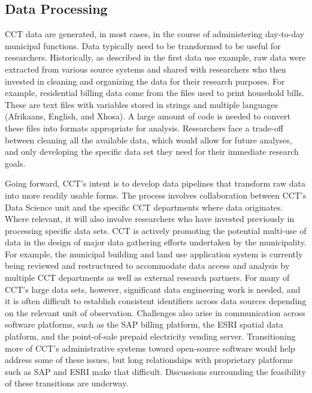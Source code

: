 \documentclass[
]{book}
\begin{document}
\hypertarget{data-processing}{%
\subsection{Data Processing}\label{data-processing}}

CCT data are generated, in most cases, in the course of administering day-to-day municipal functions. Data typically need to be transformed to be useful for researchers. Historically, as described in the first data use example, raw data were extracted from various source systems and shared with researchers who then invested in cleaning and organizing the data for their research purposes. For example, residential billing data come from the files used to print household bills. These are text files with variables stored in strings and multiple languages (Afrikaans, English, and Xhosa). A large amount of code is needed to convert these files into formats appropriate for analysis. Researchers face a trade-off between cleaning all the available data, which would allow for future analyses, and only developing the specific data set they need for their immediate research goals.

Going forward, CCT's intent is to develop data pipelines that transform raw data into more readily usable forms. The process involves collaboration between CCT's Data Science unit and the specific CCT departments where data originates. Where relevant, it will also involve researchers who have invested previously in processing specific data sets. CCT is actively promoting the potential multi-use of data in the design of major data gathering efforts undertaken by the municipality. For example, the municipal building and land use application system is currently being reviewed and restructured to accommodate data access and analysis by multiple CCT departments as well as external research partners. For many of CCT's large data sets, however, significant data engineering work is needed, and it is often difficult to establish consistent identifiers across data sources depending on the relevant unit of observation. Challenges also arise in communication across software platforms, such as the SAP billing platform, the ESRI spatial data platform, and the point-of-sale prepaid electricity vending server. Transitioning more of CCT's administrative systems toward open-source software would help address some of these issues, but long relationships with proprietary platforms such as SAP and ESRI make that difficult. Discussions surrounding the feasibility of these transitions are underway.
\end{document}
